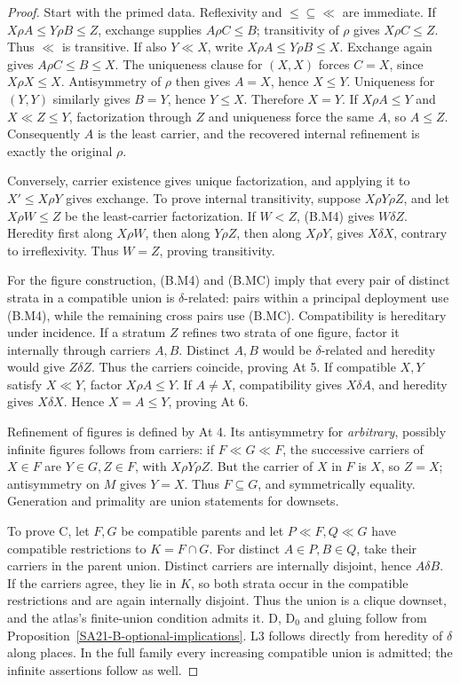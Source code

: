 \begin{proof}
Start with the primed data. Reflexivity and \(\leq\subseteq\ll\) are
immediate. If \(X\rho A\leq Y\rho B\leq Z\), exchange supplies
\(A\rho C\leq B\); transitivity of \(\rho\) gives \(X\rho C\leq Z\).
Thus \(\ll\) is transitive. If also \(Y\ll X\), write
\(X\rho A\leq Y\rho B\leq X\). Exchange again gives
\(A\rho C\leq B\leq X\). The uniqueness clause for \((X,X)\)
forces \(C=X\), since \(X\rho X\leq X\). Antisymmetry of \(\rho\)
then gives \(A=X\), hence \(X\leq Y\). Uniqueness for \((Y,Y)\)
similarly gives \(B=Y\), hence \(Y\leq X\). Therefore \(X=Y\).
If \(X\rho A\leq Y\) and \(X\ll Z\leq Y\), factorization through
\(Z\) and uniqueness force the same \(A\), so \(A\leq Z\).
Consequently \(A\) is the least carrier, and the recovered internal
refinement is exactly the original \(\rho\).

Conversely, carrier existence gives unique factorization, and applying
it to \(X'\leq X\rho Y\) gives exchange. To prove internal
transitivity, suppose \(X\rho Y\rho Z\), and let
\(X\rho W\leq Z\) be the least-carrier factorization. If \(W<Z\),
(B.M4) gives \(W\delta Z\). Heredity first along \(X\rho W\), then
along \(Y\rho Z\), then along \(X\rho Y\), gives \(X\delta X\),
contrary to irreflexivity. Thus \(W=Z\), proving transitivity.

For the figure construction, (B.M4) and (B.MC) imply that every pair of
distinct strata in a compatible union is \(\delta\)-related: pairs
within a principal deployment use (B.M4), while the remaining cross
pairs use (B.MC). Compatibility is hereditary under incidence.
If a stratum \(Z\) refines two strata of one figure, factor it
internally through carriers \(A,B\). Distinct \(A,B\) would be
\(\delta\)-related and heredity would give \(Z\delta Z\).
Thus the carriers coincide, proving At 5. If compatible \(X,Y\)
satisfy \(X\ll Y\), factor \(X\rho A\leq Y\). If \(A\ne X\),
compatibility gives \(X\delta A\), and heredity gives \(X\delta X\).
Hence \(X=A\leq Y\), proving At 6.

Refinement of figures is defined by At 4. Its antisymmetry for
\emph{arbitrary}, possibly infinite figures follows from carriers:
if \(F\ll G\ll F\), the successive carriers of \(X\in F\) are
\(Y\in G,Z\in F\), with \(X\rho Y\rho Z\). But the carrier of
\(X\) in \(F\) is \(X\), so \(Z=X\); antisymmetry on \(M\) gives
\(Y=X\). Thus \(F\subseteq G\), and symmetrically equality.
Generation and primality are union statements for downsets.

To prove C, let \(F,G\) be compatible parents and let
\(P\ll F,Q\ll G\) have compatible restrictions to \(K=F\cap G\).
For distinct \(A\in P,B\in Q\), take their carriers in the parent
union. Distinct carriers are internally disjoint, hence \(A\delta B\).
If the carriers agree, they lie in \(K\), so both strata occur in the
compatible restrictions and are again internally disjoint. Thus the
union is a clique downset, and the atlas's finite-union condition
admits it. D, D\(_0\) and gluing follow from
Proposition~\ref{SA21-B-optional-implications}. L3 follows directly
from heredity of \(\delta\) along places. In the full family every
increasing compatible union is admitted; the infinite assertions
follow as well.
\end{proof}

